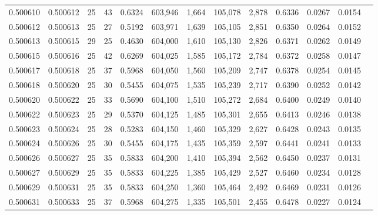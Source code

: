 \begin{tabular}{rrrrrrrrrrrrr}
0.500610 & 0.500612 &    25 &  43 &                                     0.6324 & 603,946 &   1,664 & 105,078 &   2,878 & 0.6336 & 0.0267 & 0.0154 \\
0.500612 & 0.500613 &    25 &  27 &                                     0.5192 & 603,971 &   1,639 & 105,105 &   2,851 & 0.6350 & 0.0264 & 0.0152 \\
0.500613 & 0.500615 &    29 &  25 &                                     0.4630 & 604,000 &   1,610 & 105,130 &   2,826 & 0.6371 & 0.0262 & 0.0149 \\
0.500615 & 0.500616 &    25 &  42 &                                     0.6269 & 604,025 &   1,585 & 105,172 &   2,784 & 0.6372 & 0.0258 & 0.0147 \\
0.500617 & 0.500618 &    25 &  37 &                                     0.5968 & 604,050 &   1,560 & 105,209 &   2,747 & 0.6378 & 0.0254 & 0.0145 \\
0.500618 & 0.500620 &    25 &  30 &                                     0.5455 & 604,075 &   1,535 & 105,239 &   2,717 & 0.6390 & 0.0252 & 0.0142 \\
0.500620 & 0.500622 &    25 &  33 &                                     0.5690 & 604,100 &   1,510 & 105,272 &   2,684 & 0.6400 & 0.0249 & 0.0140 \\
0.500622 & 0.500623 &    25 &  29 &                                     0.5370 & 604,125 &   1,485 & 105,301 &   2,655 & 0.6413 & 0.0246 & 0.0138 \\
0.500623 & 0.500624 &    25 &  28 &                                     0.5283 & 604,150 &   1,460 & 105,329 &   2,627 & 0.6428 & 0.0243 & 0.0135 \\
0.500624 & 0.500626 &    25 &  30 &                                     0.5455 & 604,175 &   1,435 & 105,359 &   2,597 & 0.6441 & 0.0241 & 0.0133 \\
0.500626 & 0.500627 &    25 &  35 &                                     0.5833 & 604,200 &   1,410 & 105,394 &   2,562 & 0.6450 & 0.0237 & 0.0131 \\
0.500627 & 0.500629 &    25 &  35 &                                     0.5833 & 604,225 &   1,385 & 105,429 &   2,527 & 0.6460 & 0.0234 & 0.0128 \\
0.500629 & 0.500631 &    25 &  35 &                                     0.5833 & 604,250 &   1,360 & 105,464 &   2,492 & 0.6469 & 0.0231 & 0.0126 \\
0.500631 & 0.500633 &    25 &  37 &                                     0.5968 & 604,275 &   1,335 & 105,501 &   2,455 & 0.6478 & 0.0227 & 0.0124 \\

\end{tabular}
